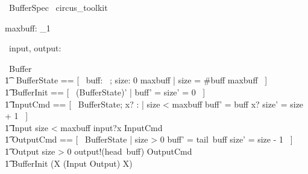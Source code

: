 \documentclass{article}
\begin{document}
\begin{zsection}
	\SECTION\ BufferSpec \parents\ circus\_toolkit
\end{zsection}

\begin{axdef}
 maxbuff: \nat_1
\end{axdef}

\begin{circus}
	\circchannel\ input, output: \nat \\
\end{circus}

\begin{circus}
	\circprocess\ Buffer \circdef \circbegin \\
    	\t1 \circstate\ BufferState == [~ buff: \seq~\nat; size: 0 \upto maxbuff | size = \#buff \leq maxbuff ~] \\
    	\t1	BufferInit == [~ (BufferState)' | buff' = \langle\rangle \land size' = 0 ~] \\
		\t1 InputCmd == [~ \Delta BufferState; x? : \nat | size < maxbuff \land buff' = buff \cat \langle x? \rangle \land size' = size + 1 ~] \\
        \t1 Input \circdef \lcircguard size < maxbuff \rcircguard \circguard input?x \then \lschexpract InputCmd \rschexpract \\
		\t1 OutputCmd == [~ \Delta BufferState | size > 0 \land buff' = tail~buff \land size' = size - 1 ~] \\
        \t1 Output \circdef \lcircguard size > 0 \rcircguard \circguard output!(head~buff) \then \lschexpract OutputCmd \rschexpract \\
	\t1 \circspot \lschexpract BufferInit \rschexpract \circseq (\circmu X \circspot (Input \extchoice Output) \circseq X) \\
	\circend
\end{circus}
\end{document}
